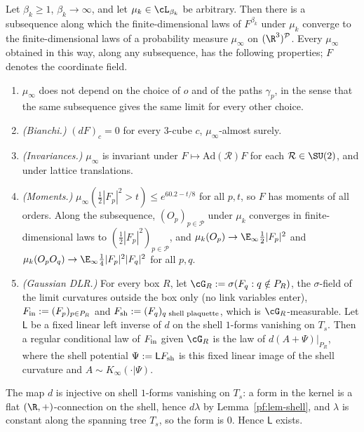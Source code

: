 \begin{proposition}[L4]\label{pf:prop-L4}
Let $\beta_k\ge1$, $\beta_k\to\infty$, and let $\mu_k\in\cL_{\beta_k}$ be arbitrary. Then there is a subsequence along which the finite-dimensional laws of $F^{\beta_k}$ under $\mu_k$ converge to the finite-dimensional laws of a probability measure $\mu_\infty$ on $(\R^3)^{\mathcal P}$. Every $\mu_\infty$ obtained in this way, along any subsequence, has the following properties; $F$ denotes the coordinate field.
\begin{enumerate}
\item[(a)] $\mu_\infty$ does not depend on the choice of $o$ and of the paths $\gamma_p$, in the sense that the same subsequence gives the same limit for every other choice.
\item[(b)] \emph{(Bianchi.)} $(dF)_c=0$ for every $3$-cube $c$, $\mu_\infty$-almost surely.
\item[(c)] \emph{(Invariances.)} $\mu_\infty$ is invariant under $F\mapsto\mathrm{Ad}(\mathcal R)F$ for each $\mathcal R\in\SU(2)$, and under lattice translations.
\item[(d)] \emph{(Moments.)} $\mu_\infty(\tfrac12|F_p|^2>t)\le e^{60.2-t/8}$ for all $p,t$, so $F$ has moments of all orders. Along the subsequence, $(O_p)_{p\in\mathcal P}$ under $\mu_k$ converges in finite-dimensional laws to $(\tfrac12|F_p|^2)_{p\in\mathcal P}$, and $\mu_k(O_p)\to\E_\infty\tfrac12|F_p|^2$ and $\mu_k(O_pO_q)\to\E_\infty\tfrac14|F_p|^2|F_q|^2$ for all $p,q$.
\item[(e)] \emph{(Gaussian DLR.)} For every box $R$, let $\cG_R:=\sigma(F_q:q\notin P_R)$, the $\sigma$-field of the limit curvatures outside the box only (no link variables enter), $F_{\rm in}:=(F_p)_{p\in P_R}$ and $F_{\rm sh}:=(F_q)_{q\text{ shell plaquette}}$, which is $\cG_R$-measurable. Let $\mathsf L$ be a fixed linear left inverse of $d$ on the shell $1$-forms vanishing on $T_s$. Then a regular conditional law of $F_{\rm in}$ given $\cG_R$ is the law of $d(A+\Psi)|_{P_R}$, where the shell potential $\Psi:=\mathsf LF_{\rm sh}$ is this fixed linear image of the shell curvature and $A\sim K_\infty(\cdot|\Psi)$.
\end{enumerate}
\end{proposition}

The map $d$ is injective on shell $1$-forms vanishing on $T_s$: a form in the kernel is a flat $(\R,+)$-connection on the shell, hence $d\lambda$ by Lemma~\ref{pf:lem-shell}, and $\lambda$ is constant along the spanning tree $T_s$, so the form is $0$. Hence $\mathsf L$ exists.

